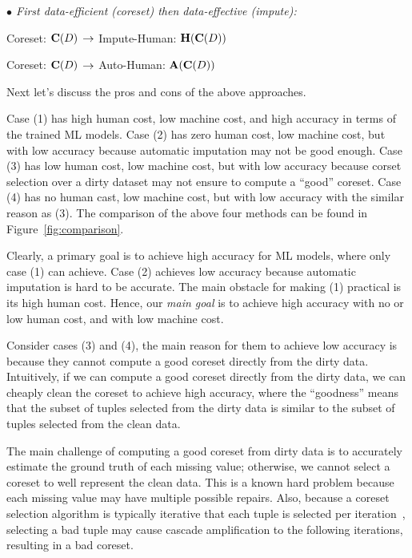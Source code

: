 \stab
\textit{$\bullet$ First data-efficient (coreset) then data-effective (impute):}

\bi
	\item[(3)] Coreset: $\mathbf{C}(D)$ $\rightarrow$ Impute-Human: $\mathbf{H}(\mathbf{C}(D))$
	\item[(4)] Coreset: $\mathbf{C}(D)$ $\rightarrow$ Auto-Human: $\mathbf{A}(\mathbf{C}(D))$  
\ei

Next let's discuss the pros and cons of the above approaches. 

Case (1) has high human cost, low machine cost, and high accuracy in terms of the trained ML models.
%
Case (2) has zero human cost, low machine cost, but with low accuracy because automatic imputation may not be good enough.
%
Case (3) has low human cost, low machine cost, but with low accuracy because corset selection over a dirty dataset may not ensure to compute a ``good'' coreset. 
%
Case (4) has no human cast, low machine cost, but with low accuracy with the similar reason as  (3).
%
The comparison of the above four methods can be found in Figure~\ref{fig:comparison}.


 Clearly, a primary goal is to achieve high accuracy for ML models, where only case (1) can achieve. 
Case (2) achieves low accuracy because automatic imputation is hard to be accurate.
The main obstacle for making (1) practical is its high human cost. 
Hence, our \textit{main goal} is to achieve high accuracy with no or low human cost, and with low machine cost.

Consider cases (3) and (4), the main reason for them to achieve low accuracy is because they cannot compute a good coreset directly from the dirty data. Intuitively, if we can compute a good coreset directly from the dirty data, we can cheaply clean the coreset to achieve high accuracy, where the ``goodness'' means that the subset of tuples selected from the dirty data is similar to the subset of tuples selected from the clean data.

The main challenge of computing a good coreset from dirty data is to accurately estimate the ground truth of each missing value; otherwise, we cannot select a coreset to well represent the clean data. This is a known hard problem because each missing value may have multiple possible repairs. Also, because a coreset selection algorithm is typically iterative that each tuple is selected per iteration~\cite{DBLP:conf/icml/MirzasoleimanBL20}, selecting a bad tuple may cause cascade amplification to the following iterations, resulting in a bad coreset.


